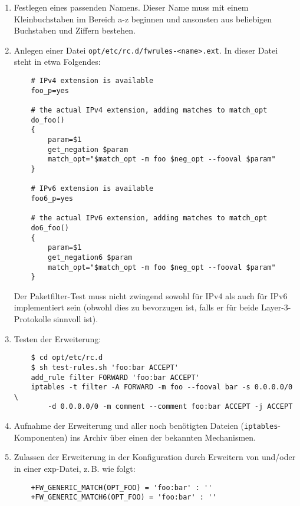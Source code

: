 \begin{enumerate}
\item Festlegen eines passenden Namens. Dieser Name muss mit einem
Kleinbuchstaben im Bereich a-z beginnen und ansonsten aus beliebigen
Buchstaben und Ziffern bestehen.


\item Anlegen einer Datei \texttt{opt/etc/rc.d/fwrules-<name>.ext}.
In dieser Datei steht in etwa Folgendes:

\begin{example}
\begin{verbatim}
    # IPv4 extension is available
    foo_p=yes

    # the actual IPv4 extension, adding matches to match_opt
    do_foo()
    {
        param=$1
        get_negation $param
        match_opt="$match_opt -m foo $neg_opt --fooval $param"
    }

    # IPv6 extension is available
    foo6_p=yes

    # the actual IPv6 extension, adding matches to match_opt
    do6_foo()
    {
        param=$1
        get_negation6 $param
        match_opt="$match_opt -m foo $neg_opt --fooval $param"
    }
\end{verbatim}
\end{example}

Der Paketfilter-Test muss nicht zwingend sowohl für IPv4 als auch für IPv6
implementiert sein (obwohl dies zu bevorzugen ist, falls er für beide
Layer-3-Protokolle sinnvoll ist).

\item Testen der Erweiterung:

\begin{example}
\begin{verbatim}
    $ cd opt/etc/rc.d
    $ sh test-rules.sh 'foo:bar ACCEPT'
    add_rule filter FORWARD 'foo:bar ACCEPT'
    iptables -t filter -A FORWARD -m foo --fooval bar -s 0.0.0.0/0 \
        -d 0.0.0.0/0 -m comment --comment foo:bar ACCEPT -j ACCEPT
\end{verbatim}
\end{example}

\item Aufnahme der Erweiterung und aller noch benötigten Dateien
(\texttt{iptables}-Komponenten) ins Archiv über einen
der bekannten Mechanismen.
\item Zulassen der Erweiterung in der Konfiguration durch Erweitern
von \var{FW\_GENERIC\_MATCH} und/oder \var{FW\_GENERIC\_MATCH6} in einer
exp-Datei, z.\,B. wie folgt:

\begin{example}
\begin{verbatim}
    +FW_GENERIC_MATCH(OPT_FOO) = 'foo:bar' : ''
    +FW_GENERIC_MATCH6(OPT_FOO) = 'foo:bar' : ''
\end{verbatim}
\end{example}
\end{enumerate}

